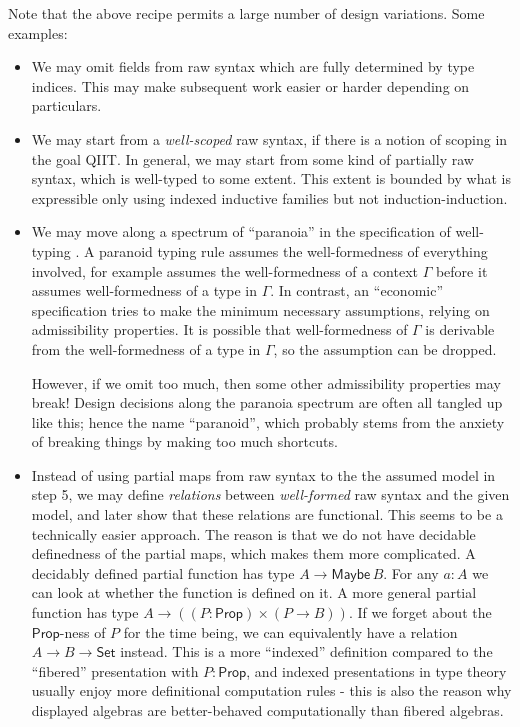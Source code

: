\documentclass[12pt,a4paper,twoside,openany]{book}
\theoremstyle{remark}
\theoremstyle{definition}
\theoremstyle{theorem}
\newcommand{\ms}[1]{\mathsf{#1}}
\newcommand{\Set}{\mathsf{Set}}
\begin{document}
Note that the above recipe permits a large number of design variations. Some
examples:
\begin{itemize}
\item We may omit fields from raw syntax which are fully determined by type indices.
      This may make subsequent work easier or harder depending on particulars.
\item We may start from a \emph{well-scoped} raw syntax, if there is a notion of
      scoping in the goal QIIT. In general, we may start from some kind of partially
      raw syntax, which is well-typed to some extent. This extent is bounded by what
      is expressible only using indexed inductive families but not
      induction-induction.
\item We may move along a spectrum of ``paranoia'' in the specification of
      well-typing \cite[Section~9.2]{winterhalter-thesis}. A paranoid typing rule
      assumes the well-formedness of everything involved, for example assumes the
      well-formedness of a context $\Gamma$ before it assumes well-formedness of a
      type in $\Gamma$. In contrast, an ``economic'' specification tries to make the
      minimum necessary assumptions, relying on admissibility properties. It is
      possible that well-formedness of $\Gamma$ is derivable from the
      well-formedness of a type in $\Gamma$, so the assumption can be dropped.

      However, if we omit too much, then some other admissibility properties may
      break! Design decisions along the paranoia spectrum are often all tangled
      up like this; hence the name ``paranoid'', which probably stems from the
      anxiety of breaking things by making too much shortcuts.
    \item Instead of using partial maps from raw syntax to the the assumed model
      in step 5, we may define \emph{relations} between \emph{well-formed} raw
      syntax and the given model, and later show that these relations are
      functional.  This seems to be a technically easier approach. The reason is
      that we do not have decidable definedness of the partial maps, which makes
      them more complicated.  A decidably defined partial function has type $A
      \to \ms{Maybe}\,B$. For any $a : A$ we can look at whether the function is
      defined on it. A more general partial function has type $A \to ((P :
      \ms{Prop}) \times (P \to B))$.  If we forget about the $\ms{Prop}$-ness of
      $P$ for the time being, we can equivalently have a relation $A \to B \to
      \Set$ instead.  This is a more ``indexed'' definition compared to the
      ``fibered'' presentation with $P : \ms{Prop}$, and indexed presentations
      in type theory usually enjoy more definitional computation rules - this
      is also the reason why displayed algebras are better-behaved computationally
      than fibered algebras.
\end{itemize}
\end{document}
